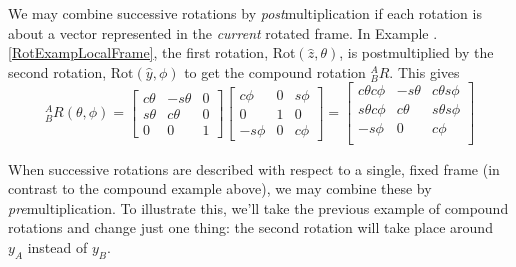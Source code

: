 We may combine successive rotations by {\it post}multiplication if each rotation is about a vector represented in the {\it current} rotated frame.
In  Example \thechapter.\ref{RotExampLocalFrame}, the first rotation, Rot$(\hat{z},\theta)$, is postmultiplied by the second rotation, $\mathrm{Rot}(\hat{y},\phi)$ to get the compound rotation $^A_BR$. This gives
\[
^A_BR(\theta, \phi) =
\left[
\begin{array}{ccc}
 c\theta & -s\theta & 0  \\
 s\theta &  c\theta & 0  \\
   0     &     0    & 1
\end{array}\right]
\left[
\begin{array}{ccc}
c\phi  & 0  & s\phi  \\
0      & 1  &   0    \\
-s\phi & 0  & c\phi
\end{array}\right]
=
\left[
\begin{array}{ccc}
c\theta c\phi       &     -s\theta      &  c\theta s\phi   \\
s\theta c\phi       &      c\theta      &  s\theta s\phi   \\
-s\phi              &         0         &   c\phi         \\
\end{array}\right]
\]




When successive rotations are described with respect to a single, fixed frame (in contrast to the compound example above), we may combine these by {\it pre}multiplication.   To illustrate this, we'll take the previous example of compound rotations and change just one thing:  the second rotation will take place around $y_A$ instead of $y_B$.




